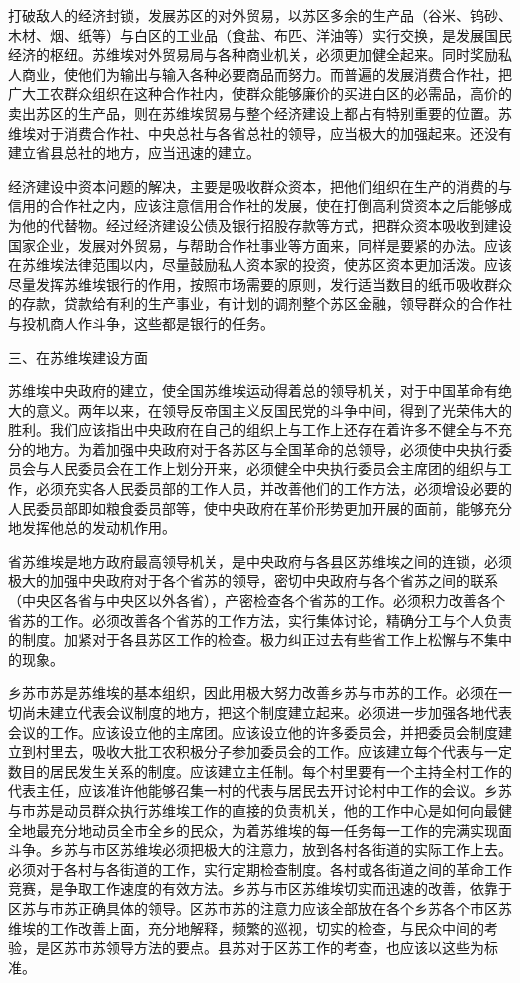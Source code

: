 打破敌人的经济封锁，发展苏区的对外贸易，以苏区多余的生产品（谷米、钨砂、木材、烟、纸等）与白区的工业品（食盐、布匹、洋油等）实行交换，是发展国民经济的枢纽。苏维埃对外贸易局与各种商业机关，必须更加健全起来。同时奖励私人商业，使他们为输出与输入各种必要商品而努力。而普遍的发展消费合作社，把广大工农群众组织在这种合作社内，使群众能够廉价的买进白区的必需品，高价的卖出苏区的生产品，则在苏维埃贸易与整个经济建设上都占有特别重要的位置。苏维埃对于消费合作社、中央总社与各省总社的领导，应当极大的加强起来。还没有建立省县总社的地方，应当迅速的建立。

经济建设中资本问题的解决，主要是吸收群众资本，把他们组织在生产的消费的与信用的合作社之内，应该注意信用合作社的发展，使在打倒高利贷资本之后能够成为他的代替物。经过经济建设公债及银行招股存款等方式，把群众资本吸收到建设国家企业，发展对外贸易，与帮助合作社事业等方面来，同样是要紧的办法。应该在苏维埃法律范围以内，尽量鼓励私人资本家的投资，使苏区资本更加活泼。应该尽量发挥苏维埃银行的作用，按照市场需要的原则，发行适当数目的纸币吸收群众的存款，贷款给有利的生产事业，有计划的调剂整个苏区金融，领导群众的合作社与投机商人作斗争，这些都是银行的任务。

三、在苏维埃建设方面

苏维埃中央政府的建立，使全国苏维埃运动得着总的领导机关，对于中国革命有绝大的意义。两年以来，在领导反帝国主义反国民党的斗争中间，得到了光荣伟大的胜利。我们应该指出中央政府在自己的组织上与工作上还存在着许多不健全与不充分的地方。为着加强中央政府对于各苏区与全国革命的总领导，必须使中央执行委员会与人民委员会在工作上划分开来，必须健全中央执行委员会主席团的组织与工作，必须充实各人民委员部的工作人员，并改善他们的工作方法，必须增设必要的人民委员部即如粮食委员部等，使中央政府在革价形势更加开展的面前，能够充分地发挥他总的发动机作用。

省苏维埃是地方政府最高领导机关，是中央政府与各县区苏维埃之间的连锁，必须极大的加强中央政府对于各个省苏的领导，密切中央政府与各个省苏之间的联系（中央区各省与中央区以外各省），产密检查各个省苏的工作。必须积力改善各个省苏的工作。必须改善各个省苏的工作方法，实行集体讨论，精确分工与个人负责的制度。加紧对于各县苏区工作的检查。极力纠正过去有些省工作上松懈与不集中的现象。

乡苏市苏是苏维埃的基本组织，因此用极大努力改善乡苏与市苏的工作。必须在一切尚未建立代表会议制度的地方，把这个制度建立起来。必须进一步加强各地代表会议的工作。应该设立他的主席团。应该设立他的许多委员会，并把委员会制度建立到村里去，吸收大批工农积极分子参加委员会的工作。应该建立每个代表与一定数目的居民发生关系的制度。应该建立主任制。每个村里要有一个主持全村工作的代表主任，应该准许他能够召集一村的代表与居民去开讨论村中工作的会议。乡苏与市苏是动员群众执行苏维埃工作的直接的负责机关，他的工作中心是如何向最健全地最充分地动员全市全乡的民众，为着苏维埃的每一任务每一工作的完满实现面斗争。乡苏与市区苏维埃必须把极大的注意力，放到各村各街道的实际工作上去。必须对于各村与各街道的工作，实行定期检查制度。各村或各街道之间的革命工作竞赛，是争取工作速度的有效方法。乡苏与市区苏维埃切实而迅速的改善，依靠于区苏与市苏正确具体的领导。区苏市苏的注意力应该全部放在各个乡苏各个市区苏维埃的工作改善上面，充分地解释，频繁的巡视，切实的检查，与民众中间的考验，是区苏市苏领导方法的要点。县苏对于区苏工作的考查，也应该以这些为标准。

